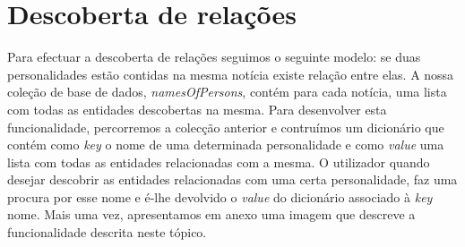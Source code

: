 \section{Descoberta de relações}

Para efectuar a descoberta de relações seguimos o seguinte modelo: se duas personalidades estão contidas na mesma notícia existe relação entre elas.
A nossa coleção de base de dados, \textit{namesOfPersons}, contém para cada notícia, uma lista com todas as entidades descobertas na mesma. Para desenvolver esta funcionalidade, percorremos a colecção anterior e contruímos um dicionário que contém como \textit{key} o nome de uma determinada personalidade e como \textit{value} uma lista com todas as entidades relacionadas com a mesma. O utilizador quando desejar descobrir as entidades relacionadas com uma certa personalidade, faz uma procura por esse nome e é-lhe devolvido o \textit{value} do dicionário associado à \textit{key} nome. Mais uma vez, apresentamos em anexo uma imagem que descreve a funcionalidade descrita neste tópico.

